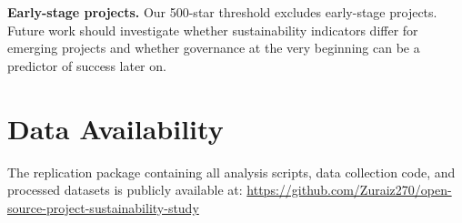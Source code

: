 \documentclass[conference]{IEEEtran}
\begin{document}
\textbf{Early-stage projects.} Our 500-star threshold excludes early-stage projects. Future work should investigate whether sustainability indicators differ for emerging projects and whether governance at the very beginning can be a predictor of success later on.


\section*{Data Availability}

The replication package containing all analysis scripts, data collection code, and processed datasets is publicly available at: \url{https://github.com/Zuraiz270/open-source-project-sustainability-study}

\end{document}
